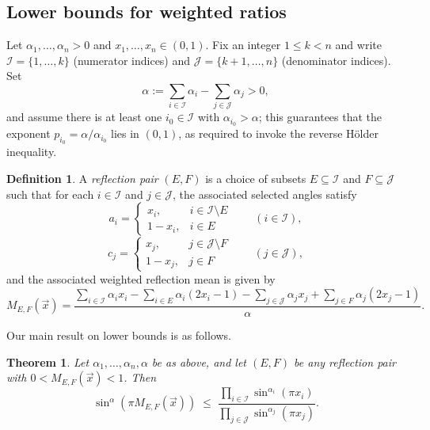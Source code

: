 \documentclass[12pt]{amsart}
\newtheorem{theorem}{Theorem}[section]
\theoremstyle{definition}
\newtheorem{definition}{Definition}[section]
\begin{document}
\subsection{Lower bounds for weighted ratios}
\label{ssec:lower}

Let $\alpha_1,\ldots,\alpha_n > 0$ and $x_1,\ldots,x_n \in (0,1)$. Fix an integer
$1 \le k < n$ and write $\mathcal{I} = \{1,\ldots,k\}$ (numerator indices) and
$\mathcal{J} = \{k+1,\ldots,n\}$ (denominator indices). Set
\[
\alpha := \sum_{i\in\mathcal I} \alpha_i - \sum_{j\in\mathcal J} \alpha_j > 0,
\]
and assume there is at least one $i_0\in\mathcal I$ with $\alpha_{i_0}>\alpha$; this
guarantees that the exponent $p_{i_0}=\alpha/\alpha_{i_0}$ lies in $(0,1)$, as required to
invoke the reverse H\"older inequality.

\begin{definition}\label{def:lower-reflection}
A \emph{reflection pair} $(E,F)$ is a choice of subsets $E \subseteq \mathcal I$ and
$F\subseteq\mathcal J$ such that for each $i\in \mathcal I$ and $j\in\mathcal J$, the associated selected angles satisfy
\[
a_i = \begin{cases} x_i, & i\in\mathcal I\setminus E\\ 1-x_i, & i\in E\end{cases}
\qquad (i\in\mathcal I),
\]
\[
c_j = \begin{cases} x_j, & j\in\mathcal J\setminus F\\ 1-x_j, & j\in F\end{cases}
\qquad (j\in\mathcal J),
\]
and the associated weighted reflection mean is given by
\begin{equation}\label{eq:MEFdef}
M_{E,F}(\vec x) = \frac{\displaystyle\sum_{i\in\mathcal I}\alpha_i x_i - \sum_{i\in E}\alpha_i(2x_i-1)
- \sum_{j\in\mathcal J}\alpha_j x_j + \sum_{j\in F}\alpha_j(2x_j-1)}{\alpha}.
\end{equation}
\end{definition}

Our main result on lower bounds is as follows.

\begin{theorem}\label{thm:lower-main}
Let $\alpha_1,\ldots,\alpha_n,\alpha$ be as above, and let $(E,F)$ be any reflection pair
with $0<M_{E,F}(\vec x)<1$. Then
\begin{equation}\label{eq:genineq}
\sin^{\alpha}\!\left(\pi M_{E,F}(\vec x)\right)
\;\leq\;
\frac{\displaystyle\prod_{i\in\mathcal I} \sin^{\alpha_i}(\pi x_i)}
     {\displaystyle\prod_{j\in\mathcal J} \sin^{\alpha_j}(\pi x_j)}.
\end{equation}
\end{theorem}
\end{document}
